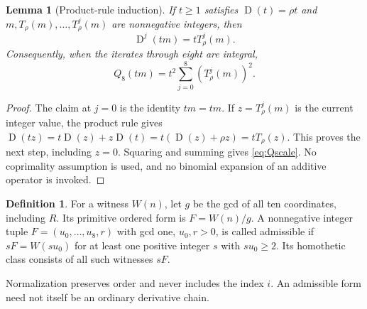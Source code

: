 \documentclass[11pt]{article}
\newcommand{\D}{\operatorname{D}}
\newtheorem{lemma}[theorem]{Lemma}
\theoremstyle{definition}
\newtheorem{definition}[theorem]{Definition}
\theoremstyle{remark}
\begin{document}
\begin{lemma}[Product-rule induction]\label{lem:scale}
If $t\ge1$ satisfies $\D(t)=\rho t$ and
$m,T_\rho(m),\ldots,T_\rho^j(m)$ are nonnegative integers, then
\begin{equation}\label{eq:iterate}
 \D^j(tm)=tT_\rho^j(m).
\end{equation}
Consequently, when the iterates through eight are integral,
\begin{equation}\label{eq:Qscale}
 Q_8(tm)=t^2\sum_{j=0}^8(T_\rho^j(m))^2.
\end{equation}
\end{lemma}
\begin{proof}
The claim at $j=0$ is the identity $tm=tm$. If $z=T_\rho^j(m)$ is the
current integer value, the product rule gives
$\D(tz)=t\D(z)+z\D(t)=t(\D(z)+\rho z)=tT_\rho(z)$.
This proves the next step, including $z=0$. Squaring and summing gives
\eqref{eq:Qscale}. No coprimality assumption is used, and no binomial
expansion of an additive operator is invoked.
\end{proof}

\begin{definition}\label{def:form}
For a witness $W(n)$, let $g$ be the gcd of all ten coordinates,
including $R$. Its primitive ordered form is $F=W(n)/g$.
A nonnegative integer tuple
$F=(u_0,\ldots,u_8,r)$ with gcd one, $u_0,r>0$, is called admissible
if $sF=W(su_0)$ for at least one positive integer $s$ with $su_0\ge2$.
Its homothetic class consists of all such witnesses $sF$.
\end{definition}
Normalization preserves order and never includes the index $i$.
An admissible form need not itself be an ordinary derivative chain.
\end{document}
